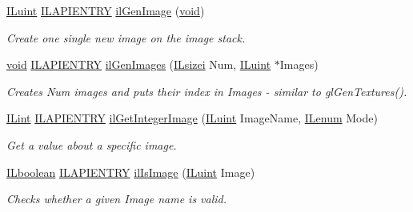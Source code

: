 \begin{DoxyCompactItemize}
\hyperlink{group__il__types_gaff8e86a1072c8d7cfe387fb87c6ed8e1}{I\+Luint} \hyperlink{_i_l_8h_a69c08a8d06df986f7e46f209d131ef2f}{I\+L\+A\+P\+I\+E\+N\+T\+R\+Y} \hyperlink{group__image__mgt_ga056ebbb4dc5b18e027c555fcf39bd3c4}{il\+Gen\+Image} (\hyperlink{_i_l_8h_a5530e04d947bcddd83639ea7940faf10}{void})
\begin{DoxyCompactList}\small\item\em Create one single new image on the image stack. \end{DoxyCompactList}\item 
\hyperlink{_i_l_8h_a5530e04d947bcddd83639ea7940faf10}{void} \hyperlink{_i_l_8h_a69c08a8d06df986f7e46f209d131ef2f}{I\+L\+A\+P\+I\+E\+N\+T\+R\+Y} \hyperlink{group__image__mgt_ga2bd61fd22ff429363d44a4eaff3b064d}{il\+Gen\+Images} (\hyperlink{group__il__types_gad51812c5d3fd67d85973dd7a7cb80d8e}{I\+Lsizei} Num, \hyperlink{group__il__types_gaff8e86a1072c8d7cfe387fb87c6ed8e1}{I\+Luint} $\ast$Images)
\begin{DoxyCompactList}\small\item\em Creates Num images and puts their index in Images -\/ similar to gl\+Gen\+Textures(). \end{DoxyCompactList}\item 
\hyperlink{group__il__types_ga8effe51a00daaa0878631e5af75a36cb}{I\+Lint} \hyperlink{_i_l_8h_a69c08a8d06df986f7e46f209d131ef2f}{I\+L\+A\+P\+I\+E\+N\+T\+R\+Y} \hyperlink{group__image__mgt_ga73ee03b6167d7615a0da58c509e3863c}{il\+Get\+Integer\+Image} (\hyperlink{group__il__types_gaff8e86a1072c8d7cfe387fb87c6ed8e1}{I\+Luint} Image\+Name, \hyperlink{group__il__types_ga62ca73445716183ef42b1f3906a45ed0}{I\+Lenum} Mode)
\begin{DoxyCompactList}\small\item\em Get a value about a specific image. \end{DoxyCompactList}\item 
\hyperlink{group__il__types_gaa6aa7c95cfdc06b4d8601ef832b7bb0a}{I\+Lboolean} \hyperlink{_i_l_8h_a69c08a8d06df986f7e46f209d131ef2f}{I\+L\+A\+P\+I\+E\+N\+T\+R\+Y} \hyperlink{group__image__mgt_gad94d46b20c049a81d8fff84fc7193f94}{il\+Is\+Image} (\hyperlink{group__il__types_gaff8e86a1072c8d7cfe387fb87c6ed8e1}{I\+Luint} Image)
\begin{DoxyCompactList}\small\item\em Checks whether a given {\itshape Image} name is valid. \end{DoxyCompactList}\end{DoxyCompactItemize}


